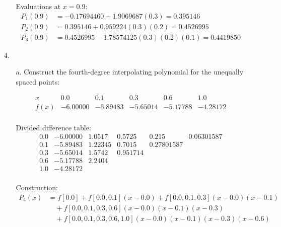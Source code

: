 \begin{enumerate}
\begin{enumerate}
        Evaluations at \( x = 0.9 \):
        \[
          \boxed{
            \begin{aligned}
              P_1(0.9) &= -0.17694460 + 1.9069687(0.3) = 0.395146 \\
              P_2(0.9) &= 0.395146 + 0.959224(0.3)(0.2) = 0.4526995 \\
              P_3(0.9) &= 0.4526995 - 1.78574125(0.3)(0.2)(0.1) = 0.4419850
            \end{aligned}
          }
        \]
    \end{enumerate}

  \item[4.]
    \begin{enumerate}
      \item[a.] Construct the fourth-degree interpolating polynomial for the
        unequally spaced points:

        \[
          \begin{array}{c|ccccc}
            x & 0.0 & 0.1 & 0.3 & 0.6 & 1.0 \\
            \hline
            f(x) & -6.00000 & -5.89483 & -5.65014 & -5.17788 & -4.28172 \\
          \end{array}
        \]

        Divided difference table:
        \[
          \begin{array}{c|ccccc}
            0.0 & -6.00000 & 1.0517 & 0.5725 & 0.215 & 0.06301587 \\
            0.1 & -5.89483 & 1.22345 & 0.7015 & 0.27801587 & \\
            0.3 & -5.65014 & 1.5742 & 0.951714 & & \\
            0.6 & -5.17788 & 2.2404 & & & \\
            1.0 & -4.28172 & & & & \\
          \end{array}
        \]

        \underline{Construction}:
        \[
          \begin{aligned}
            P_4(x) &= f[0.0] + f[0.0,0.1](x-0.0) +
            f[0.0,0.1,0.3](x-0.0)(x-0.1) \\
            &\quad + f[0.0,0.1,0.3,0.6](x-0.0)(x-0.1)(x-0.3) \\
            &\quad + f[0.0,0.1,0.3,0.6,1.0](x-0.0)(x-0.1)(x-0.3)(x-0.6)
          \end{aligned}
        \]


\end{enumerate}
\end{enumerate}
